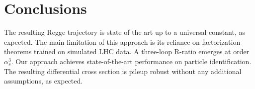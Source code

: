 \section{Conclusions}\label{sec:conclusions}

The resulting Regge trajectory is state of the art up to a universal
constant, as expected. The main limitation of this approach is its
reliance on factorization theorems trained on simulated LHC data. A
three-loop R-ratio emerges at order $\alpha_s^3$. Our approach achieves
state-of-the-art performance on particle identification. The resulting
differential cross section is pileup robust without any additional
assumptions, as expected.

